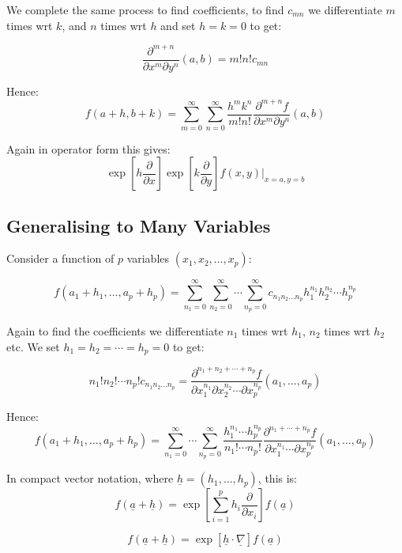 We complete the same process to find coefficients, to find $c_{mn}$ we differentiate $m$ times wrt $k$, and $n$ times wrt $h$ and set $h = k = 0$ to get:

\[
    \frac{\partial^{m+n}}{\partial x^m \partial y^n} (a,b) = m!n!c_{mn}
\]

Hence:
\[
    f(a + h, b + k) = \sum_{m=0}^{\infty} \sum_{n=0}^{\infty} \frac{h^m k^n}{m!n!} \frac{\partial^{m+n} f}{\partial x^m \partial y^n} (a, b)
\]


Again in operator form this gives:
\[
    \exp \left[h \frac{\partial}{\partial x}\right] \exp \left[k \frac{\partial}{\partial y}\right] f(x, y) \biggr\rvert_{x=a, y=b}
\]

\subsection{Generalising to Many Variables}
Consider a function of $p$ variables $(x_1, x_2, \ldots, x_p)$:

\[
    f(a_1 + h_1, \ldots, a_p + h_p) = \sum_{n_1 = 0}^{\infty} \sum_{n_2 = 0}^{\infty} \cdots \sum_{n_p = 0}^{\infty} c_{n_1 n_ 2 \ldots n_p} h_1^{n_1} h_2^{n_2} \cdots h_p^{n_p}
\]

Again to find the coefficients we differentiate $n_1$ times wrt $h_1$, $n_2$ times wrt $h_2$ etc. We set $h_1 = h_2 = \cdots = h_p = 0$ to get:

\[
    n_1! n_2! \cdots n_p! c_{n_1 n_2 \ldots n_p} = \frac{\partial^{n_1 + n_2 + \cdots + n_p} f}{\partial x_1^{n_1} \partial x_2^{n_2} \cdots \partial x_p^{n_p}} (a_1, \ldots, a_p)
\]

Hence:
\[
    f(a_1 + h_1, \ldots, a_p + h_p) = \sum_{n_1 = 0}^{\infty} \cdots \sum_{n_p = 0}^{\infty} \frac{h_1^{n_1} \cdots h_p^{n_p}}{n_1! \cdots n_p!} \frac{\partial^{n_1 + \cdots + n_p} f}{\partial x_1^{n_1} \cdots \partial x_p^{n_p}} (a_1, \ldots, a_p)
\]

In compact vector notation, where $\underline{h} = (h_1, \ldots, h_p)$, this is:
\[
    f(\underline{a} + \underline{h}) = \exp \left[\sum_{i=1}^{p} h_i \frac{\partial}{\partial x_i}\right] f(\underline{a})
\]

\[
    f(\underline{a} + \underline{h}) = \exp \left[ \underline{h} \cdot \underline{\nabla} \right] f(\underline{a})
\]
